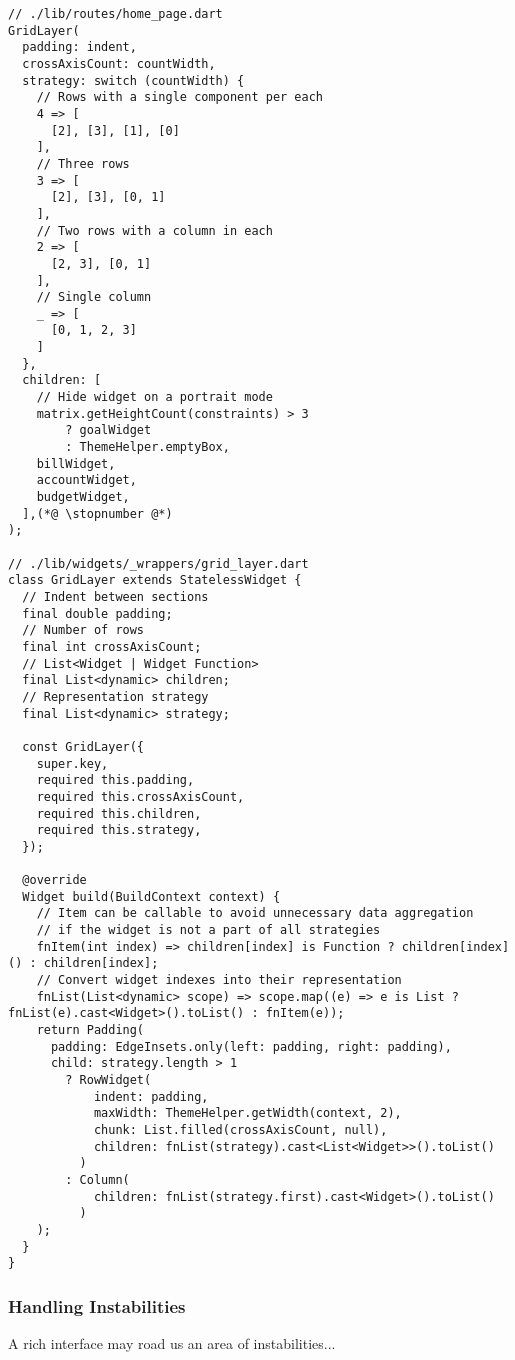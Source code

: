 \begin{lstlisting}
// ./lib/routes/home_page.dart
GridLayer(
  padding: indent,
  crossAxisCount: countWidth,
  strategy: switch (countWidth) {
    // Rows with a single component per each
    4 => [
      [2], [3], [1], [0]
    ],
    // Three rows
    3 => [
      [2], [3], [0, 1]
    ],
    // Two rows with a column in each
    2 => [
      [2, 3], [0, 1]
    ],
    // Single column
    _ => [
      [0, 1, 2, 3]
    ]
  },
  children: [
    // Hide widget on a portrait mode
    matrix.getHeightCount(constraints) > 3
        ? goalWidget
        : ThemeHelper.emptyBox,
    billWidget,
    accountWidget,
    budgetWidget,
  ],(*@ \stopnumber @*)
);

// ./lib/widgets/_wrappers/grid_layer.dart
class GridLayer extends StatelessWidget {
  // Indent between sections
  final double padding;
  // Number of rows
  final int crossAxisCount;
  // List<Widget | Widget Function>
  final List<dynamic> children;
  // Representation strategy
  final List<dynamic> strategy;

  const GridLayer({
    super.key,
    required this.padding,
    required this.crossAxisCount,
    required this.children,
    required this.strategy,
  });

  @override
  Widget build(BuildContext context) {
    // Item can be callable to avoid unnecessary data aggregation
    // if the widget is not a part of all strategies
    fnItem(int index) => children[index] is Function ? children[index]() : children[index];
    // Convert widget indexes into their representation
    fnList(List<dynamic> scope) => scope.map((e) => e is List ? fnList(e).cast<Widget>().toList() : fnItem(e));
    return Padding(
      padding: EdgeInsets.only(left: padding, right: padding),
      child: strategy.length > 1
        ? RowWidget(
            indent: padding,
            maxWidth: ThemeHelper.getWidth(context, 2),
            chunk: List.filled(crossAxisCount, null),
            children: fnList(strategy).cast<List<Widget>>().toList()
          )
        : Column(
            children: fnList(strategy.first).cast<Widget>().toList()
          )
    );
  }
}
\end{lstlisting}


\subsubsection{Handling Instabilities}

A rich interface may road us an area of instabilities...

